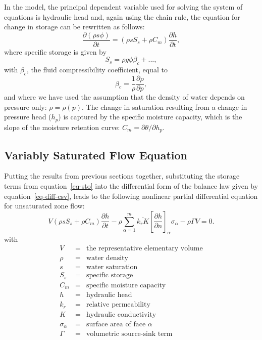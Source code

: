 \documentclass[fleqn]{article}
\begin{document}
In the model, the principal dependent variable used for solving the system
of equations is hydraulic head and, again using the chain rule, the equation
for change in storage can be rewritten as follows:
\begin{equation}
  \frac{\partial (\rho s \phi)}{\partial t} =
  \left(
    \rho s S_s + \rho C_m
  \right)
  \frac{\partial h}{\partial t},
  \label{eq-sto}
\end{equation}
where specific storage is given by 
\begin{equation}
  S_s = \rho g \phi \beta_c + ...,
\end{equation}
with $\beta_c$, the fluid compressibility coefficient, equal to
\begin{equation}
  \beta_c = \frac{1}{\rho}\frac{\partial \rho}{\partial p},
\end{equation}
and where we have used the assumption that the density of water depends
on pressure only: $\rho = \rho(p)$. The change in saturation resulting 
from a change in pressure head ($h_p$) is captured by the specific 
moisture capacity, which is the slope of the moisture retention curve: 
$C_m = \partial \theta / \partial h_p$.

\subsection{Variably Saturated Flow Equation}
Putting the results from previous sections together, substituting the storage terms
from equation~\ref{eq-sto} into the differential form of the balance law
given by equation~\ref{eq-diff-csv}, leads to the following nonlinear
partial differential equation for unsaturated zone flow:
\begin{equation}  
  V
  \left(
    \rho s S_s + \rho C_m
  \right)
  \frac{\partial h}{\partial t} -
  \rho \sum_{\alpha=1}^{m} \overline{k_r K}
  \left[\frac{\partial h}{\partial n}\right]_\alpha \sigma_\alpha -
  \rho \Gamma V = 0.
\end{equation}
with
\begin{eqnarray*}
  V &=& \textrm{the representative elementary volume} \\
  \rho &=& \textrm{water density} \\
  s &=& \textrm{water saturation} \\
  S_s &=& \textrm{specific storage} \\
  C_m &=& \textrm{specific moisture capacity} \\
  h &=& \textrm{hydraulic head} \\
  k_r &=& \textrm{relative permeability} \\
  K &=& \textrm{hydraulic conductivity} \\
  \sigma_\alpha &=& \textrm{surface area of face $\alpha$} \\
  \Gamma &=& \textrm{volumetric source-sink term}
\end{eqnarray*}
\end{document}
